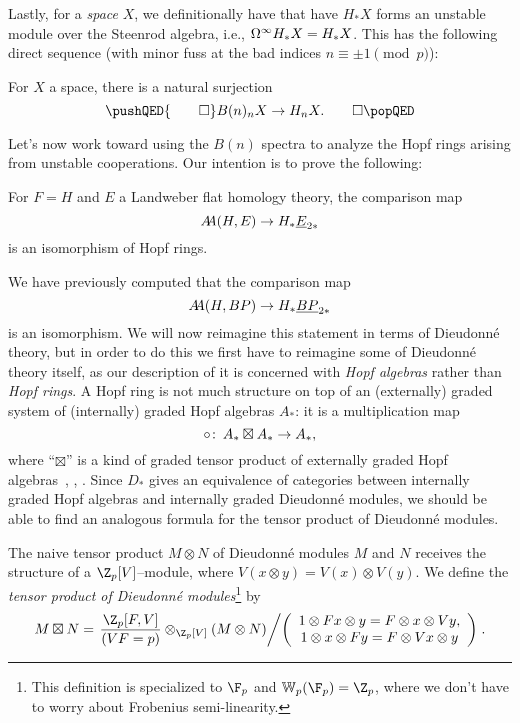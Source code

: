 Lastly, for a \emph{space} \(X\), we definitionally have that have \(H_* X\) forms an unstable module over the Steenrod algebra, i.e., \(\Omega^\infty H_* X = H_* X\).  This has the following direct sequence (with minor fuss at the bad indices \(n \equiv \pm 1 \pmod p\)):

\begin{lemma}
For \(X\) a space, there is a natural surjection
\[\pushQED{\qed}
B(n)_n X \to H_n X. \qedhere
\popQED\]
\end{lemma}



Let's now work toward using the \(B(n)\) spectra to analyze the Hopf rings arising from unstable cooperations.  Our intention is to prove the following:
\begin{theorem}\label{LEFTUnstableCooperations}
For \(F = H\) and \(E\) a Landweber flat homology theory, the comparison map \[A\!\!A(H, E) \to H_* \underline{\smash{E}}_{2*}\] is an isomorphism of Hopf rings.
\end{theorem}
\noindent We have previously computed that the comparison map \[A\!\!A(H, BP) \to H_* \underline{\smash{BP}}_{2*}\] is an isomorphism.  We will now reimagine this statement in terms of Dieudonn\'e theory, but in order to do this we first have to reimagine some of Dieudonn\'e theory itself, as our description of it is concerned with \emph{Hopf algebras} rather than \emph{Hopf rings}.  A Hopf ring is not much structure on top of an (externally) graded system of (internally) graded Hopf algebras \(A_*\): it is a multiplication map \[\circ\colon\thinspace A_* \boxtimes A_* \to A_*,\] where ``\(\boxtimes\)'' is a kind of graded tensor product of externally graded Hopf algebras~\cite[Proposition 2.6]{HuntonTurner}, \cite[Definition 2.2]{BuchstaberLazarev}, \cite[Section 5]{GoerssDieudonne}.  Since \(D_*\) gives an equivalence of categories between internally graded Hopf algebras and internally graded Dieudonn\'e modules, we should be able to find an analogous formula for the tensor product of Dieudonn\'e modules.

\begin{definition}{\cite[pg.\ 154]{GoerssDieudonne}}
The naive tensor product \(M \otimes N\) of Dieudonn\'e modules \(M\) and \(N\) receives the structure of a \(\Z_p[V]\)--module, where \(V(x \otimes y) = V(x) \otimes V(y)\).  We define the \textit{tensor product of Dieudonn\'e modules}\footnote{This definition is specialized to \(\F_p\) and \(\mathbb W_p(\F_p) = \Z_p\), where we don't have to worry about Frobenius semi-linearity.} by \[M \boxtimes N = \left.\frac{\Z_p[F, V]}{(VF = p)} \otimes_{\Z_p[V]} (M \otimes N) \middle/ \left( \begin{array}{c} 1 \otimes Fx \otimes y = F \otimes x \otimes Vy, \\ 1 \otimes x \otimes Fy = F \otimes Vx \otimes y \end{array} \right) \right. .\]
\end{definition}

